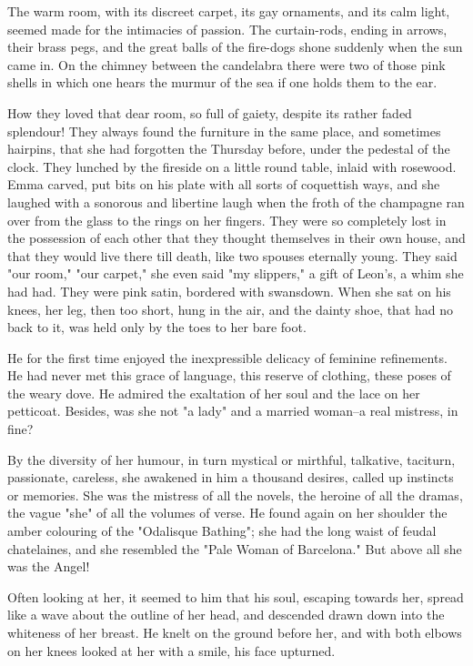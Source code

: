 \documentclass[11pt,twocolumn]{ltugboat}
\begin{document}
The warm room, with its discreet carpet, its gay ornaments, and its
calm light, seemed made for the intimacies of passion. The curtain-rods,
ending in arrows, their brass pegs, and the great balls of the fire-dogs
shone suddenly when the sun came in. On the chimney between the
candelabra there were two of those pink shells in which one hears the
murmur of the sea if one holds them to the ear.

How they loved that dear room, so full of gaiety, despite its rather
faded splendour! They always found the furniture in the same place, and
sometimes hairpins, that she had forgotten the Thursday before, under
the pedestal of the clock. They lunched by the fireside on a little
round table, inlaid with rosewood. Emma carved, put bits on his plate
with all sorts of coquettish ways, and she laughed with a sonorous and
libertine laugh when the froth of the champagne ran over from the
glass to the rings on her fingers. They were so completely lost in
the possession of each other that they thought themselves in their
own house, and that they would live there till death, like two spouses
eternally young. They said "our room," "our carpet," she even said "my
slippers," a gift of Leon's, a whim she had had. They were pink satin,
bordered with swansdown. When she sat on his knees, her leg, then too
short, hung in the air, and the dainty shoe, that had no back to it, was
held only by the toes to her bare foot.

He for the first time enjoyed the inexpressible delicacy of feminine
refinements. He had never met this grace of language, this reserve of
clothing, these poses of the weary dove. He admired the exaltation of
her soul and the lace on her petticoat. Besides, was she not "a lady"
and a married woman--a real mistress, in fine?

By the diversity of her humour, in turn mystical or mirthful, talkative,
taciturn, passionate, careless, she awakened in him a thousand desires,
called up instincts or memories. She was the mistress of all the novels,
the heroine of all the dramas, the vague "she" of all the volumes
of verse. He found again on her shoulder the amber colouring of the
"Odalisque Bathing"; she had the long waist of feudal chatelaines, and
she resembled the "Pale Woman of Barcelona." But above all she was the
Angel!

Often looking at her, it seemed to him that his soul, escaping towards
her, spread like a wave about the outline of her head, and descended
drawn down into the whiteness of her breast. He knelt on the ground
before her, and with both elbows on her knees looked at her with a
smile, his face upturned.
\end{document}
